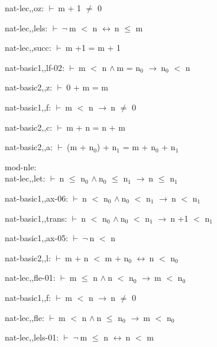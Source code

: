 \documentclass[a4paper]{article}
\newcommand{\Fol}{\mbox{$\vdash\ $}}
\newcommand{\Not}{\mbox{$\neg\ $}}
\newcommand{\And}{\mbox{$\wedge\ $}}
\newcommand{\Imp}{\mbox{$\rightarrow\ $}}
\newcommand{\Equiv}{\mbox{$\leftrightarrow\ $}}
\begin{document}
nat-lec,,oz: 
 \Fol m + 1 $\neq$ 0



nat-lec,,lels: 
 \Fol \Not m $<$ n \Equiv n $\le$ m



nat-lec,,succ: 
 \Fol m +1 = m + 1



nat-basic1,,lf-02: 
 \Fol m $<$ n \And m = $\mbox{n}_{0}$ \Imp $\mbox{n}_{0}$ $<$ n



nat-basic2,,z: 
 \Fol 0 + m = m



nat-basic1,,f: 
 \Fol m $<$ n \Imp n $\neq$ 0



nat-basic2,,c: 
 \Fol m + n = n + m



nat-basic2,,a: 
 \Fol (m + $\mbox{n}_{0}$) + $\mbox{n}_{1}$ = m + $\mbox{n}_{0}$ + $\mbox{n}_{1}$



\bigskip

mod-nle:\\ nat-lec,,let: 
 \Fol n $\le$ $\mbox{n}_{0}$ \And $\mbox{n}_{0}$ $\le$ $\mbox{n}_{1}$ \Imp n $\le$ $\mbox{n}_{1}$



nat-basic1,,ax-06: 
 \Fol n $<$ $\mbox{n}_{0}$ \And $\mbox{n}_{0}$ $<$ $\mbox{n}_{1}$ \Imp n $<$ $\mbox{n}_{1}$



nat-basic1,,trans: 
 \Fol n $<$ $\mbox{n}_{0}$ \And $\mbox{n}_{0}$ $<$ $\mbox{n}_{1}$ \Imp n +1 $<$ $\mbox{n}_{1}$



nat-basic1,,ax-05: 
 \Fol \Not n $<$ n



nat-basic2,,l: 
 \Fol m + n $<$ m + $\mbox{n}_{0}$ \Equiv n $<$ $\mbox{n}_{0}$



nat-lec,,fle-01: 
 \Fol m $\le$ n \And n $<$ $\mbox{n}_{0}$ \Imp m $<$ $\mbox{n}_{0}$



nat-basic1,,f: 
 \Fol m $<$ n \Imp n $\neq$ 0



nat-lec,,fle: 
 \Fol m $<$ n \And n $\le$ $\mbox{n}_{0}$ \Imp m $<$ $\mbox{n}_{0}$



nat-lec,,lels-01: 
 \Fol \Not m $\le$ n \Equiv n $<$ m
\end{document}
